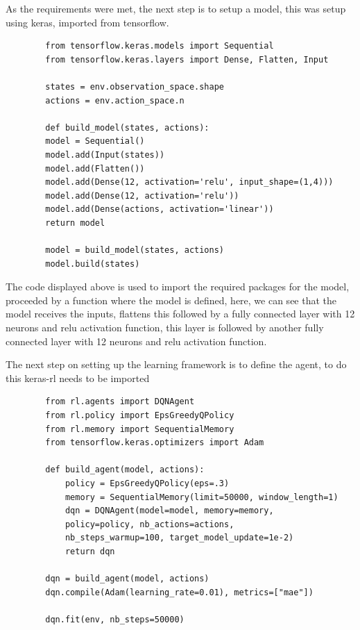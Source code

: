     As the requirements were met, the next step is to setup a model, this was setup using keras, imported from tensorflow.
    \pagebreak
    \lstset{language=Python}
    \lstset{frame=lines}
    \lstset{basicstyle=\footnotesize}
    \begin{lstlisting}
        from tensorflow.keras.models import Sequential
        from tensorflow.keras.layers import Dense, Flatten, Input
        
        states = env.observation_space.shape
        actions = env.action_space.n
        
        def build_model(states, actions):
        model = Sequential() 
        model.add(Input(states))
        model.add(Flatten())
        model.add(Dense(12, activation='relu', input_shape=(1,4)))
        model.add(Dense(12, activation='relu'))
        model.add(Dense(actions, activation='linear'))
        return model
        
        model = build_model(states, actions)
        model.build(states)
    \end{lstlisting}
    
    The code displayed above is used to import the required packages for the model, proceeded by a function where the model is defined, here, we can see that the model receives the inputs, flattens this followed by a fully connected layer with 12 neurons and relu activation function,
    this layer is followed by another fully connected layer with 12 neurons and relu activation function.
    
    The next step on setting up the learning framework is to define the agent, to do this keras-rl needs to be imported
    
    \lstset{language=Python}
    \lstset{frame=lines}
    \lstset{basicstyle=\footnotesize}
    \begin{lstlisting}
        from rl.agents import DQNAgent
        from rl.policy import EpsGreedyQPolicy
        from rl.memory import SequentialMemory          
        from tensorflow.keras.optimizers import Adam

        def build_agent(model, actions):
            policy = EpsGreedyQPolicy(eps=.3)
            memory = SequentialMemory(limit=50000, window_length=1)
            dqn = DQNAgent(model=model, memory=memory, 
            policy=policy, nb_actions=actions, 
            nb_steps_warmup=100, target_model_update=1e-2)
            return dqn

        dqn = build_agent(model, actions)
        dqn.compile(Adam(learning_rate=0.01), metrics=["mae"])

        dqn.fit(env, nb_steps=50000)
    \end{lstlisting}

